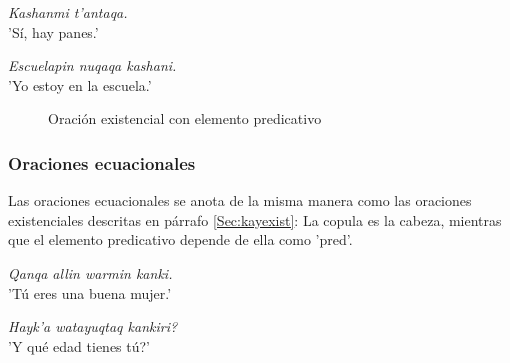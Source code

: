 \documentclass[a4paper,11pt,DIV12]{scrartcl}
\begin{document}
\begin{examples}
 \item {\em Kashanmi t'antaqa.}\\
      'S\'i, hay panes.'
\item\label{Ex:kayexist} {\em Escuelapin nuqaqa kashani.}\\
      'Yo estoy en la escuela.'
  	\hfill{\small \citep[91]{Cusi2}}
\end{examples}

\begin{figure}
\begin{center}
\caption{Oraci\'on existencial con elemento predicativo}\label{Fig:kayexist}
\end{center}
\end{figure}

\subsubsection{Oraciones ecuacionales}\label{Sec:kayecuacional}
Las oraciones ecuacionales se anota de la misma manera como las oraciones existenciales descritas en p\'arrafo \ref{Sec:kayexist}: La copula es la cabeza, mientras que el elemento predicativo depende de ella como 'pred'.

\begin{examples}
 \item\label{Ex:kayecuacional} {\em Qanqa allin warmin kanki.}\\
      'T\'u eres una buena mujer.'
 \item {\em Hayk'a watayuqtaq kankiri?}\\
      '{\textquestiondown}Y qu\'e edad tienes t\'u?'\\
  	\hfill{\small \citep[91-92]{Cusi2}}
\end{examples}
 
\end{document}
